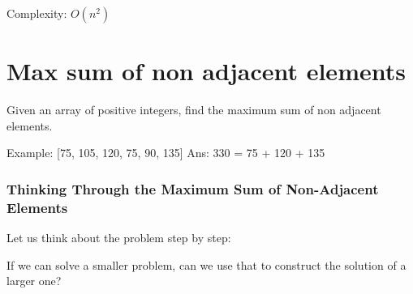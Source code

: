 \documentclass{article}
\begin{document}
Complexity: \(O(n^2)\)

\section{Max sum of non adjacent elements}

Given an array of positive integers, find the maximum sum of non adjacent elements.

Example: [75, 105, 120, 75, 90, 135]  
Ans: 330 = 75 + 120 + 135

\subsubsection*{Thinking Through the Maximum Sum of Non-Adjacent Elements}

Let us think about the problem step by step:

If we can solve a smaller problem, can we use that to construct the solution of a larger one?
\end{document}
